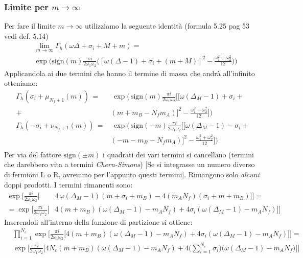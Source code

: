 \documentclass[a4paper,12pt]{article}
\newcommand{\sign}{\mbox{sign}}
\begin{document}
\subsubsection{Limite per $m \rightarrow \infty$}
Per fare il limite $m \rightarrow \infty$ utilizziamo la seguente identità \citep{Aharony:2013dha} (formula 5.25 pag 53 vedi def. 5.14)
\begin{align*}
 &\lim_{ m \rightarrow \infty } \Gamma_h ( \omega \Delta + \sigma_i + M + m) = \\
& \exp \bigg( \mbox{sign} (m) \frac{\pi i }{2 \omega_1 \omega_2} \bigg( [ \omega (\Delta
 -1) + \sigma_i + (m+M)]^2 - \frac{\omega_1^2 + \omega_2^2}{12} \bigg) \bigg)
\end{align*} 
Applicandola ai due termini che hanno il termine di massa che andrà all'infinito otteniamo:
\begin{align*}
\Gamma_h ( \sigma_i + \mu_{N_f+1}(m)) \, = &\, \exp \bigg( \, \mbox{sign}(m) \frac{\pi i}{2 \omega_1 \omega_2 } \big[ [ \omega (\Delta_M - 1) + \sigma_i + \\
+ & ( m + m_B - N_f m_A)]^2 - \frac{ \omega_1^2 + \omega_2^2 }{12} \big] \bigg )\\
\Gamma_h ( - \sigma_i + \nu_{N_f+1}(m)) \, = &\, \exp \bigg( \, \mbox{sign}(-m) \frac{\pi i}{2 \omega_1 \omega_2 } \big[ [ \omega (\Delta_M - 1) - \sigma_i + \\
&( - m - m_B - N_f m_A)]^2 - \frac{ \omega_1^2 + \omega_2^2 }{12} \big] \bigg )\\
\end{align*}
Per via del fattore $\sign(\pm m)$ i quadrati dei vari termini si cancellano (termini che darebbero vita a termini \emph{Chern-Simons})
[Se si integrasse un numero diverso di fermioni L o R, avremmo per l'appunto questi termini]. Rimangono solo \emph{alcuni} doppi prodotti. I termini rimanenti sono:
\begin{align*}
\exp \bigg[ \frac{\pi i}{2 \omega_1 \omega_2 } \bigg[& 4 \,  \omega (\Delta_M - 1) ( m + \sigma_i + m_B )  - 4 ( m_A N_f) ( \sigma_i + m + m_B) \bigg] \bigg]  = \\
 = \exp \bigg[ \frac{\pi i}{2 \omega_1 \omega_2 } \bigg[& 4  ( m  + m_B ) ( \omega (\Delta_M - 1) -  m_A N_f ) + 	4 \sigma_i  (\omega (\Delta_M - 1) -  m_A N_f)  \bigg] \bigg]
\end{align*}
Inserendoli all'interno della funzione di partizione si ottiene:
\begin{align*}
 &\prod_{i=1}^{N_c} \exp \bigg[ \frac{\pi i}{2 \omega_1 \omega_2 } \bigg[ 4  ( m  + m_B ) ( \omega (\Delta_M - 1) -  m_A N_f ) + 	4 \sigma_i  (\omega (\Delta_M - 1) -  m_A N_f)\bigg] \bigg] = \\
 &\exp \bigg[ \frac{\pi i}{2 \omega_1 \omega_2 } \bigg[ 4 N_c  ( m  + m_B ) ( \omega (\Delta_M - 1) -  m_A N_f ) +4\big( \sum_{i=1}^{N_c}	 \sigma_i  \big) \big(\omega (\Delta_M - 1) -  m_A N_f \big)  \bigg] \bigg] \\
\end{align*}
\end{document}
